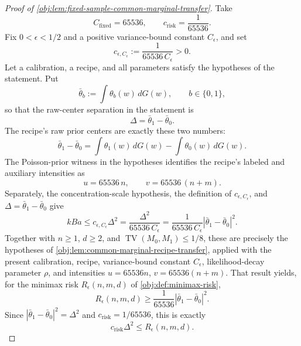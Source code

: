 \begin{proof}[Proof of \cref{obj:lem:fixed-sample-common-marginal-transfer}]
Take
\[
C_{\mathrm{fixed}}=65536,
\qquad
c_{\mathrm{risk}}=\frac1{65536}.
\]
Fix \(0<\epsilon<1/2\) and a positive variance-bound constant \(C_\epsilon\), and set
\[
c_{\epsilon,C_\epsilon}:=\frac{1}{65536\,C_\epsilon}>0.
\]
Let a calibration, a recipe, and all parameters satisfy the hypotheses of the statement.  Put
\[
\bar\theta_b:=\int \theta_b(w)\,dG(w),\qquad b\in\{0,1\},
\]
so that the raw-center separation in the statement is
\[
\Delta=\bar\theta_1-\bar\theta_0.
\]
The recipe's raw prior centers are exactly these two numbers:
\[
\bar\theta_1-\bar\theta_0
=
\int \theta_1(w)\,dG(w)-\int \theta_0(w)\,dG(w).
\]
The Poisson-prior witness in the hypotheses identifies the recipe's labeled and auxiliary intensities as
\[
u=65536\,n,
\qquad
v=65536\,(n+m).
\]
Separately, the concentration-scale hypothesis, the definition of \(c_{\epsilon,C_\epsilon}\), and \(\Delta=\bar\theta_1-\bar\theta_0\) give
\[
kBa
\le
c_{\epsilon,C_\epsilon}\Delta^2
=
\frac{\Delta^2}{65536\,C_\epsilon}
=
\frac{1}{65536\,C_\epsilon}
\left|\bar\theta_1-\bar\theta_0\right|^2.
\]
Together with \(n\ge1\), \(d\ge2\), and \(\operatorname{TV}(M_0,M_1)\le1/8\), these are precisely the hypotheses of \cref{obj:lem:common-marginal-recipe-transfer}, applied with the present calibration, recipe, variance-bound constant \(C_\epsilon\), likelihood-decay parameter \(\rho\), and intensities \(u=65536n\), \(v=65536(n+m)\).  That result yields, for the minimax risk \(R_\epsilon(n,m,d)\) of \cref{obj:def:minimax-risk},
\[
R_\epsilon(n,m,d)
\ge
\frac{1}{65536}
\left|\bar\theta_1-\bar\theta_0\right|^2.
\]
Since \(|\bar\theta_1-\bar\theta_0|^2=\Delta^2\) and \(c_{\mathrm{risk}}=1/65536\), this is exactly
\[
c_{\mathrm{risk}}\Delta^2\le R_\epsilon(n,m,d).
\] %
\end{proof}
